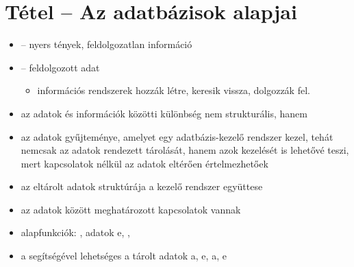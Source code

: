 \documentclass[main.tex]{subfiles}
\begin{document}
  \section{Tétel – Az adatbázisok alapjai} %
    
  \begin{itemize}
    \item {} – nyers tények, feldolgozatlan információ
    
    \item {} – feldolgozott adat
    \begin{itemize}
      \item információs rendszerek hozzák létre,
      keresik vissza, dolgozzák fel.
    \end{itemize}

    \item az adatok és információk közötti különbség
    nem strukturális, hanem 
    
    \item az  adatok gyűjteménye,
    amelyet egy adatbázis-kezelő rendszer kezel, tehát
    nemcsak az adatok rendezett tárolását, hanem azok
    kezelését is lehetővé teszi, mert kapcsolatok nélkül
    az adatok eltérően értelmezhetőek

    \item az eltárolt adatok struktúrája a
    kezelő rendszer együttese

    \item az adatok között meghatározott kapcsolatok vannak
    
    \item alapfunkciók: , adatok e,
    , 

    \item a  segítségével lehetséges a tárolt adatok
    a, e,
    a, e
  \end{itemize}
\end{document}
